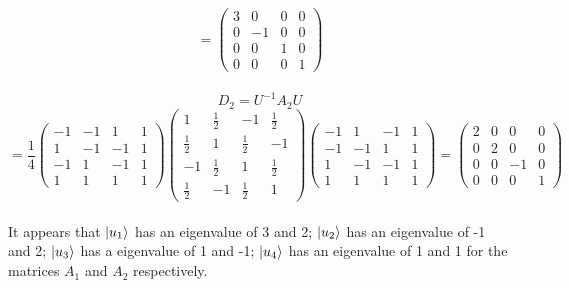 \begin{sol}
\begin{equation}
=\begin{pmatrix}3&0&0&0\\0&-1&0&0\\0&0&1&0\\0&0&0&1\end{pmatrix}
\end{equation}\\
\begin{equation}
	D_2=U^{-1}A_2U
\end{equation}\begin{equation}
	=\frac{1}{4}\begin{pmatrix}-1&-1&1&1\\1&-1&-1&1\\-1&1&-1&1\\1&1&1&1\end{pmatrix} \begin{pmatrix}1&\frac{1}{2}&-1&\frac{1}{2}\\\frac{1}{2}&1&\frac{1}{2}&-1\\-1&\frac{1}{2}&1&\frac{1}{2}\\\frac{1}{2}&-1&\frac{1}{2}&1\end{pmatrix}\begin{pmatrix}-1&1&-1&1\\-1&-1&1&1\\1&-1&-1&1\\1&1&1&1\end{pmatrix}=\begin{pmatrix}2&0&0&0\\0&2&0&0\\0&0&-1&0\\0&0&0&1\end{pmatrix}
\end{equation}\\
It appears that $\ket{u_1}$ has an eigenvalue of 3 and 2; $\ket{u_2}$ has an eigenvalue of -1 and 2; $\ket{u_3}$ has a eigenvalue of 1 and -1; $\ket{u_4}$ has an eigenvalue of 1 and 1 for the matrices $A_1$ and $A_2$ respectively.
\end{sol}